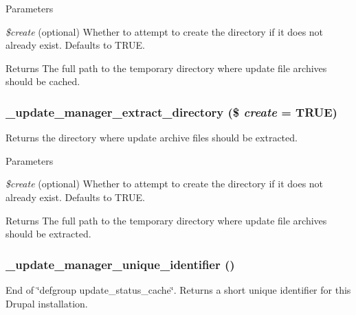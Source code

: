 \begin{DoxyParams}{Parameters}
\item[{\em \$create}](optional) Whether to attempt to create the directory if it does not already exist. Defaults to TRUE.\end{DoxyParams}
\begin{DoxyReturn}{Returns}
The full path to the temporary directory where update file archives should be cached. 
\end{DoxyReturn}
\hypertarget{update_8module_a4a2bc7d471c60456416dcf60978be1d9}{
\subsubsection[{\_\-update\_\-manager\_\-extract\_\-directory}]{\setlength{\rightskip}{0pt plus 5cm}\_\-update\_\-manager\_\-extract\_\-directory (\$ {\em create} = {\ttfamily TRUE})}}
\label{update_8module_a4a2bc7d471c60456416dcf60978be1d9}
Returns the directory where update archive files should be extracted.


\begin{DoxyParams}{Parameters}
\item[{\em \$create}](optional) Whether to attempt to create the directory if it does not already exist. Defaults to TRUE.\end{DoxyParams}
\begin{DoxyReturn}{Returns}
The full path to the temporary directory where update file archives should be extracted. 
\end{DoxyReturn}
\hypertarget{update_8module_aa0bce789c1af82be02444e68642d9fa2}{
\subsubsection[{\_\-update\_\-manager\_\-unique\_\-identifier}]{\setlength{\rightskip}{0pt plus 5cm}\_\-update\_\-manager\_\-unique\_\-identifier ()}}
\label{update_8module_aa0bce789c1af82be02444e68642d9fa2}
End of \char`\"{}defgroup update\_\-status\_\-cache\char`\"{}. Returns a short unique identifier for this Drupal installation.

